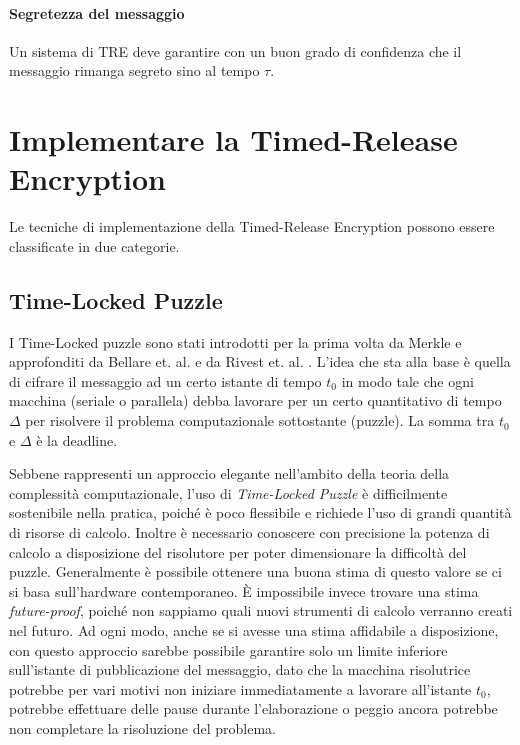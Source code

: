 \paragraph{Segretezza del messaggio}
\label{parag:segretezza-tre}
Un sistema di TRE deve garantire con un buon
grado di confidenza che il messaggio rimanga segreto sino al tempo $ \tau $.


\section{Implementare la Timed-Release Encryption}
Le tecniche di implementazione della Timed-Release Encryption possono essere classificate
in due categorie.

\subsection{Time-Locked Puzzle}
I Time-Locked puzzle sono stati introdotti per la prima volta
da Merkle \cite{Merkle:1978:SCO:359460.359473} e approfonditi
da Bellare et. al. \cite{Bellare:1996:EKE:888619}
e da Rivest et. al. \cite{Rivest96time-lockpuzzles}.
L'idea che sta alla base è quella di cifrare il messaggio ad un certo istante di tempo $ t_0 $
in modo tale che ogni macchina
(seriale o parallela) debba lavorare per un certo quantitativo di tempo $ \Delta $ per risolvere
il problema computazionale sottostante (puzzle). La somma tra $ t_0 $ e $ \Delta $ è la deadline.

Sebbene rappresenti un approccio elegante nell'ambito della teoria della complessità computazionale,
l'uso di \textit{Time-Locked Puzzle} è difficilmente sostenibile nella pratica,
poiché è poco flessibile e richiede l'uso di
grandi quantità di risorse di calcolo. Inoltre è necessario conoscere con
precisione la potenza di calcolo a disposizione del risolutore per poter
dimensionare la difficoltà del puzzle. Generalmente è possibile ottenere
una buona stima di questo valore se ci si basa sull'hardware contemporaneo. È impossibile
invece trovare una stima \textit{future-proof}, poiché non sappiamo quali nuovi strumenti di
calcolo verranno creati nel futuro.
Ad ogni modo, anche se si avesse una stima affidabile a disposizione,
con questo approccio sarebbe possibile garantire solo un limite inferiore
sull'istante di pubblicazione del messaggio, dato che la macchina risolutrice potrebbe per vari motivi
non iniziare immediatamente a lavorare all'istante $ t_0 $,
potrebbe effettuare delle pause durante l'elaborazione
o peggio ancora potrebbe non completare la risoluzione del problema.


